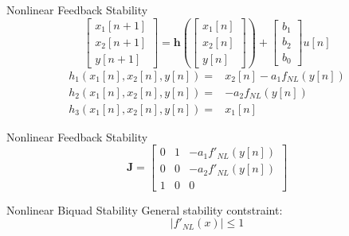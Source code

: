 \begin{frame}{Nonlinear Feedback Stability}
    \begin{equation}
        \begin{bmatrix} x_1[n+1] \\ x_2[n+1] \\ y[n+1] \end{bmatrix} =
        \mathbf{h} \left( \begin{bmatrix} x_1[n] \\ x_2[n] \\ y[n] \end{bmatrix}
        \right) + \begin{bmatrix} b_1\\ b_2\\ b_0 \end{bmatrix} u[n]
    \end{equation}
    \vspace{3ex}
    \begin{equation}
        \begin{split}
            h_1(x_1[n], x_2[n], y[n]) =& x_2[n] - a_1f_{NL}(y[n]) \\
            h_2(x_1[n], x_2[n], y[n]) =& -a_2f_{NL}(y[n]) \\
            h_3(x_1[n], x_2[n], y[n]) =& x_1[n]
        \end{split}
    \end{equation}
\end{frame}

\begin{frame}{Nonlinear Feedback Stability}
    \begin{equation}
        \mathbf{J} = \begin{bmatrix}
            0& 1& -a_1f'_{NL}(y[n]) \\
            0& 0& -a_2f'_{NL}(y[n]) \\
            1& 0& 0
        \end{bmatrix}
    \end{equation}
\end{frame}

\begin{frame}{Nonlinear Biquad Stability}
    General stability contstraint:
    \begin{equation}
        |f'_{NL}(x)| \leq 1
    \end{equation}
\end{frame}

